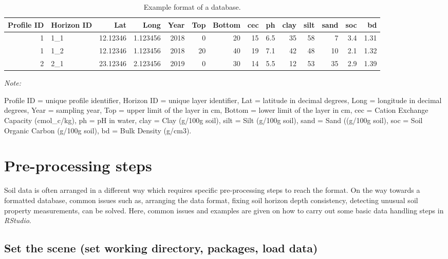 \documentclass[
  10pt,
  b5paper,
  oneside]{book}
\begin{document}
\begin{table}

\caption{\label{tab:data1}Example format of a database.}
\centering
\begin{threeparttable}
\begin{tabular}[t]{rlrrrrrrrrrrrr}
\toprule
Profile ID & Horizon ID & Lat & Long & Year & Top & Bottom & cec & ph & clay & silt & sand & soc & bd\\
\midrule
1 & 1\_1 & 12.12346 & 1.123456 & 2018 & 0 & 20 & 15 & 6.5 & 35 & 58 & 7 & 3.4 & 1.31\\
1 & 1\_2 & 12.12346 & 1.123456 & 2018 & 20 & 40 & 19 & 7.1 & 42 & 48 & 10 & 2.1 & 1.32\\
2 & 2\_1 & 23.12346 & 2.123456 & 2019 & 0 & 30 & 14 & 5.5 & 12 & 53 & 35 & 2.9 & 1.39\\
\bottomrule
\end{tabular}
\begin{tablenotes}
\item \textit{Note: } 
\item Profile ID = unique profile identifier, Horizon ID = unique layer identifier, Lat = latitude in decimal degrees, Long = longitude in decimal degrees, Year = sampling year, Top = upper limit of the layer in cm, Bottom = lower limit of the layer in cm, cec = Cation Exchange Capacity (cmol\_c/kg), ph = pH in water, clay = Clay (g/100g soil), silt = Silt (g/100g soil), sand = Sand ((g/100g soil), soc = Soil Organic Carbon (g/100g soil), bd = Bulk Density (g/cm3).
\end{tablenotes}
\end{threeparttable}
\end{table}

\hypertarget{pre-processing-steps}{%
\section{Pre-processing steps}\label{pre-processing-steps}}

Soil data is often arranged in a different way which requires specific pre-processing steps to reach the format. On the way towards a formatted database, common issues such as, arranging the data format, fixing soil horizon depth consistency, detecting unusual soil property measurements, can be solved. Here, common issues and examples are given on how to carry out some basic data handling steps in \emph{RStudio}.

\hypertarget{set-the-scene-set-working-directory-packages-load-data}{%
\subsection{Set the scene (set working directory, packages, load data)}\label{set-the-scene-set-working-directory-packages-load-data}}
\end{document}
